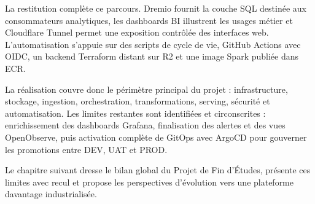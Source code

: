 La restitution complète ce parcours. Dremio fournit la couche SQL destinée aux consommateurs analytiques, les dashboards BI illustrent les usages métier et Cloudflare Tunnel permet une exposition contrôlée des interfaces web. L'automatisation s'appuie sur des scripts de cycle de vie, GitHub Actions avec OIDC, un backend Terraform distant sur R2 et une image Spark publiée dans ECR.

La réalisation couvre donc le périmètre principal du projet : infrastructure, stockage, ingestion, orchestration, transformations, serving, sécurité et automatisation. Les limites restantes sont identifiées et circonscrites : enrichissement des dashboards Grafana, finalisation des alertes et des vues OpenObserve, puis activation complète de GitOps avec ArgoCD pour gouverner les promotions entre DEV, UAT et PROD.

Le chapitre suivant dresse le bilan global du Projet de Fin d'Études, présente ces limites avec recul et propose les perspectives d'évolution vers une plateforme davantage industrialisée.

\clearpage
